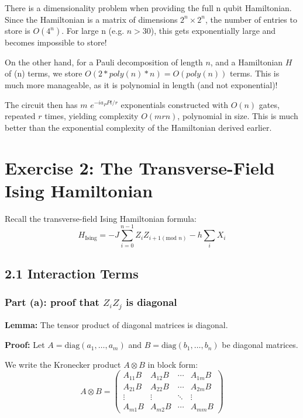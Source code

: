 \documentclass[11pt]{article}
\begin{document}
There is a dimensionality problem when providing the full n qubit Hamiltonian.
\newline
Since the Hamiltonian is a matrix of dimensions $2^n \times 2^n$, the number of entries to store is $O(4^n)$. 
\newline
For large n (e.g. $n>30$), this gets exponentially large and becomes impossible to store!

\newline
\vspace{0.5cm}
On the other hand, for a Pauli decomposition of length $n$, and a Hamiltonian $H$ of (n) terms, we store $O(2*poly(n)*n) = O(poly(n))$ terms. This is much more manageable, as it is polynomial in length (and not exponential)!

\newline
\vspace{0.5cm}
The circuit then has $m$ $e^{-ia_P P t/r}$ exponentials constructed with $O(n)$ gates, repeated $r$ times, yielding complexity $O(mrn)$, polynomial in size. This is much better than the exponential complexity of the Hamiltonian derived earlier.

\newpage

\section*{Exercise 2: The Transverse-Field Ising Hamiltonian}

Recall the transverse-field Ising Hamiltonian formula:
\begin{equation}
H_{\text{Ising}} = -J \sum_{i=0}^{n-1} Z_i Z_{i+1(\text{mod }n)} - h \sum_i X_i
\end{equation}


\subsection*{2.1 Interaction Terms}

\subsubsection*{Part (a): proof that $Z_i Z_j$ is diagonal}

\textbf{Lemma:} The tensor product of diagonal matrices is diagonal.

\textbf{Proof:} Let $A = \text{diag}(a_1, \ldots, a_m)$ and $B = \text{diag}(b_1, \ldots, b_n)$ be diagonal matrices.

We write the Kronecker product $A \otimes B$ in block form:
\begin{equation}
A \otimes B = \begin{pmatrix}
A_{11} B & A_{12} B & \cdots & A_{1m} B \\
A_{21} B & A_{22} B & \cdots & A_{2m} B \\
\vdots & \vdots & \ddots & \vdots \\
A_{m1} B & A_{m2} B & \cdots & A_{mm} B
\end{pmatrix}
\end{equation}
\end{document}
